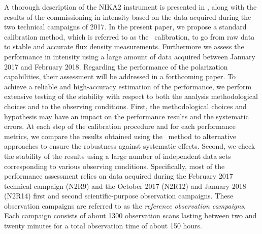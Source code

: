 A thorough description of the NIKA2 instrument is presented in \citet{Adam2018},
along with the results of the commissioning in intensity based on the
data acquired during the two technical campaigns of 2017.
%
{\lp In the present paper, we propose a standard calibration method, which is
referred to as the \baseline\ calibration, to go from raw data to
stable and accurate flux density measurements.} 
%
%
Furthermore we assess the performance in intensity using a large
amount of data acquired between January 2017 and February 2018.
Regarding the performance of the polarization capabilities, their
assessment will be addressed in a forthcoming paper.
To achieve a reliable and high-accuracy estimation
of the performance, we perform extensive testing of the
stability with respect to both the analysis methodological
choices and to the observing conditions.
{\lp First, the methodological choices and hypothesis may have an impact on
the performance results and the systematic errors. At each step of the
calibration procedure and for each performance metrics, we compare the
results obtained using the \baseline\ method to alternative approaches to
ensure the robustness against systematic effects.}
Second, we check the stability of the results using a large number of
independent data sets corresponding to various observing conditions.
Specifically, most of the performance assessment relies on data
acquired during the February 2017 technical campaign (N2R9) and the
October 2017 (N2R12) and January 2018 (N2R14) first and second
scientific-purpose observation campaigns. {\lp These observation
campaigns are referred to as the \emph{reference observation campaigns}.}
Each campaign consists of about 1300 observation scans lasting between
two and twenty minutes for a total observation time of about 150 hours. 

